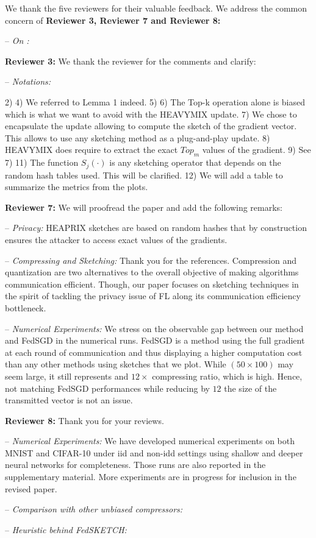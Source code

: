 \documentclass{article}
\begin{document}
We thank the five reviewers for their valuable feedback. 
We address the common concern of \textbf{Reviewer 3, Reviewer 7 and Reviewer 8:} \vspace{-5pt}

-- \textit{On :} 


\textbf{Reviewer 3:} We thank the reviewer for the comments and clarify:\vspace{-5pt}

-- \textit{Notations:} 

2) 
4) We referred to Lemma 1 indeed.
5) 
6) The Top-k operation alone is biased which is what we want to avoid with the HEAVYMIX update.
7) We chose to encapsulate the update allowing to compute the sketch of the gradient vector. This allows to use any sketching method as a plug-and-play update.
8) HEAVYMIX does require to extract the exact $Top_m$ values of the gradient.
9) See 7)
11) The function $S_j(\cdot)$ is any sketching operator that depends on the random hash tables used. This will be clarified.
12) We will add a table to summarize the metrics from the plots.




\textbf{Reviewer 7:} We will proofread the paper and add the following remarks:\vspace{-5pt}

-- \textit{Privacy:} HEAPRIX sketches are based on random hashes that by construction ensures the attacker to access exact values of the gradients.

-- \textit{Compressing and Sketching:} Thank you for the references.
Compression and quantization are two alternatives to the overall objective of making algorithms communication efficient.
Though, our paper focuses on sketching techniques in the spirit of tackling the privacy issue of FL along its communication efficiency bottleneck.


-- \textit{Numerical Experiments:} 
We stress on the observable gap between our method and FedSGD in the numerical runs. FedSGD is a method using the full gradient at each round of communication and thus displaying a higher computation cost than any other methods using sketches that we plot.
While $(50 \times 100)$ may seem large, it still represents and $12 \times$ compressing ratio, which is high. 
Hence, not matching FedSGD performances while reducing by $12$ the size of the transmitted vector is not an issue.

\textbf{Reviewer 8:} Thank you for your reviews.\vspace{-5pt}

-- \textit{Numerical Experiments:} We have developed numerical experiments on both MNIST and CIFAR-10 under iid and non-idd settings using shallow and deeper neural networks for completeness. Those runs are also reported in the supplementary material.
More experiments are in progress for inclusion in the revised paper.

-- \textit{Comparison with other unbiased compressors:} 

-- \textit{Heuristic behind FedSKETCH:} 
\end{document}
